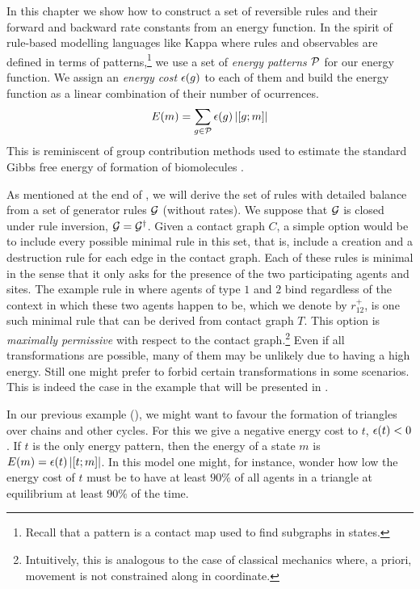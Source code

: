 In this chapter we show how to construct a set of reversible rules
and their forward and backward rate constants from an energy function.
In the spirit of rule-based modelling languages like Kappa
where rules and observables are defined in terms of patterns,\footnote{
  Recall that a pattern is a contact map used to find subgraphs in states.}
we use a set of \emph{energy patterns} $\mathcal{P}$
for our energy function.
We assign an \emph{energy cost} $\epsilon(g)$ to each of them
and build the energy function as a linear combination
of their number of ocurrences. %
\[ E(m) = \sum_{g \in \mathcal{P}} \epsilon(g) \left\lvert \left[g;m\right] \right\rvert \]
This is reminiscent of group contribution methods
used to estimate the standard Gibbs free energy of formation
of biomolecules \citep{group-contrib}.

As mentioned at the end of ,
we will derive the set of rules with detailed balance
from a set of generator rules $\mathcal{G}$ (without rates).
We suppose that $\mathcal{G}$ is closed under
rule inversion, \ie $\mathcal{G} = \mathcal{G}^\dagger$.
Given a contact graph $C$,
a simple option would be to include
every possible minimal rule in this set,
that is, include a creation and a destruction rule
for each edge in the contact graph.
Each of these rules is minimal in the sense that
it only asks for the presence of
the two participating agents and sites.
The example rule in 
where agents of type $1$ and $2$ bind
regardless of the context
in which these two agents happen to be,
which we denote by $r^+_{12}$,
is one such minimal rule
that can be derived from contact graph $T$.
This option is \emph{maximally permissive}
with respect to the contact graph.\footnote{
  Intuitively, this is analogous to the case of classical mechanics
  where, a priori, movement is not constrained along in coordinate.}
Even if all transformations are possible,
many of them may be unlikely due to having a high energy.
Still one might prefer to forbid certain transformations
in some scenarios.
This is indeed the case in the example
that will be presented in .

In our previous example (),
we might want to favour the formation of
triangles over chains and other cycles.
For this we give a negative energy cost to $t$,
\ie $\epsilon(t) < 0$.
If $t$ is the only energy pattern,
then the energy of a state $m$ is
$E(m) = \epsilon(t) \left\lvert \left[t;m\right] \right\rvert$.
In this model one might, for instance,
wonder how low the energy cost of $t$ must be
to have at least $90\%$ of all agents in a triangle
at equilibrium at least $90\%$ of the time.

